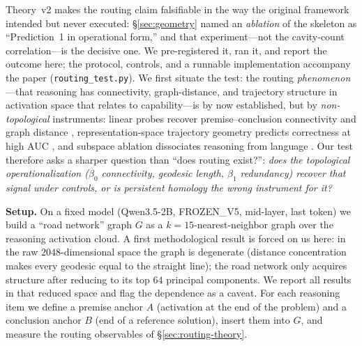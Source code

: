 \documentclass{article}
\begin{document}
Theory~v2 makes the routing claim falsifiable in the way the original framework intended but never
executed: \S\ref{sec:geometry} named an \emph{ablation} of the skeleton as ``Prediction~1 in
operational form,'' and that experiment---not the cavity-count correlation---is the decisive one. We
pre-registered it, ran it, and report the outcome here; the protocol, controls, and a runnable
implementation accompany the paper (\texttt{routing\_test.py}). We first situate the test: the routing
\emph{phenomenon}---that reasoning has connectivity, graph-distance, and trajectory structure in
activation space that relates to capability---is by now established, but by \emph{non-topological}
instruments: linear probes recover premise--conclusion connectivity and graph distance
\citep{chains2dags2601}, representation-space trajectory geometry predicts correctness at high AUC
\citep{reasoningTrajectories2604}, and subspace ablation dissociates reasoning from language
\citep{langReasonDisentangle2505}. Our test therefore asks a sharper question than ``does routing
exist?'': \emph{does the topological operationalization ($\beta_0$ connectivity, geodesic length,
$\beta_1$ redundancy) recover that signal under controls, or is persistent homology the wrong
instrument for it?}

\medskip
\noindent\textbf{Setup.} On a fixed model (Qwen3.5-2B, FROZEN\_V5, mid-layer, last token) we build a
``road network'' graph $G$ as a $k{=}15$-nearest-neighbor graph over the reasoning activation cloud.
A first methodological result is forced on us here: in the raw $2048$-dimensional space the graph is
degenerate (distance concentration makes every geodesic equal to the straight line); the road network
only acquires structure after reducing to its top $64$ principal components. We report all results in
that reduced space and flag the dependence as a caveat. For each reasoning item we define a premise
anchor $A$ (activation at the end of the problem) and a conclusion anchor $B$ (end of a reference
solution), insert them into $G$, and measure the routing observables of \S\ref{sec:routing-theory}.
\end{document}
